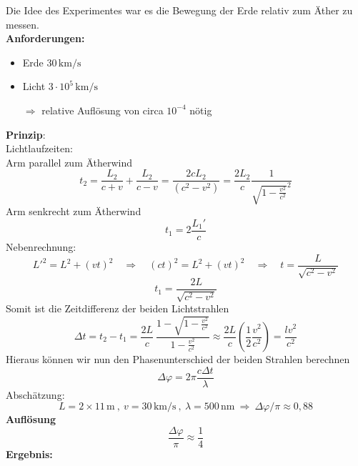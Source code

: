 \documentclass[titlepage,11pt,a4paper,ngerman]{report}
\newcommand{\tx}[1]{\textrm{#1}}
\begin{document}
Die Idee des Experimentes war es die Bewegung der Erde relativ zum Äther zu messen.\\
\textbf{Anforderungen:}
\begin{itemize}
	\item Erde $ 30 \, \tx{km} \slash \tx{s} $
	\item Licht $ 3 \cdot 10^{5} \, \tx{km} \slash \tx{s}  $
	\item[$ \Rightarrow $] relative Auflösung von circa $ 10^{-4} $ nötig
\end{itemize}
%
%
%
%
\textbf{Prinzip}:\\
Lichtlaufzeiten:\\
Arm parallel zum Ätherwind
\begin{equation*}
t_2 = \frac{L_2}{c+v} + \frac{L_2}{c-v} = \frac{2cL_2}{(c^2-v^2)} = \frac{2 L_2}{c} \frac{1}{\sqrt{1 - \frac{v^2}{c^2}}^2}
\end{equation*}
Arm senkrecht zum Ätherwind
\begin{equation*}
t_1 = 2 \frac{L_1'}{c}
\end{equation*}
Nebenrechnung:
\begin{equation*}
L'^2 = L^2 + (vt)^2 \quad \Rightarrow \quad (ct)^2 = L^2 + (vt)^2 \quad \Rightarrow \quad t = \frac{L}{\sqrt{c^2 - v^2}}
\end{equation*}
\begin{equation*}
t_1 = \frac{2 L}{\sqrt{c^2 - v^2}}
\end{equation*}
Somit ist die Zeitdifferenz der beiden Lichtstrahlen
\begin{equation*}
\Delta t = t_2 - t_1 = \frac{2L}{c} \ \frac{1 - \sqrt{1 - \frac{v^2}{c^2}}}{1 - \frac{v^2}{c^2}} \approx \frac{2L}{c} \left(\frac{1}{2} \frac{v^2}{c^2}\right) = \frac{lv^2}{c^2}
\end{equation*}
Hieraus können wir nun den Phasenunterschied der beiden Strahlen berechnen
\begin{equation*}
\Delta \varphi = 2 \pi \frac{c \Delta t}{\lambda}
\end{equation*}
Abschätzung:
\begin{equation*}
L = 2 \times 11 \, \tx{m} \ , \ v = 30 \, \tx{km} \slash \tx{s} \ , \ \lambda = 500 \, \tx{nm} \ \Rightarrow \ \Delta \varphi \slash \pi \approx 0{,}88
\end{equation*}
\textbf{Auflösung}
\begin{equation*}
\frac{\Delta \varphi}{\pi} \approx \frac{1}{4}
\end{equation*}
\textbf{Ergebnis:}\\
\end{document}
